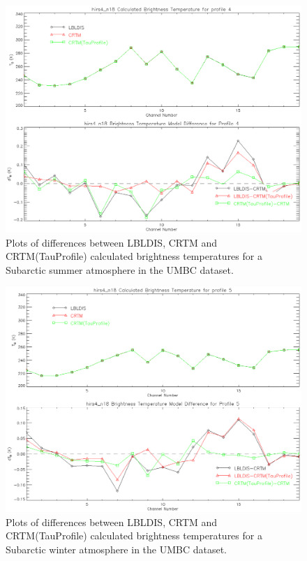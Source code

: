 \begin{figure}[htp]
  \centering{}
  \includegraphics[scale=0.8]{./graphics/SubArc_Summer_04.eps}
  \caption{Plots of differences between LBLDIS, CRTM and CRTM(TauProfile) calculated brightness temperatures for
   a Subarctic summer atmosphere in the UMBC dataset.}
  \label{fig:Subarctic_Summer_Dep}
\end{figure}

\begin{figure}[htp]
  \centering{}
  \includegraphics[scale=0.8]{./graphics/SubArc_Winter_05.eps}
  \caption{Plots of differences between LBLDIS, CRTM and CRTM(TauProfile) calculated brightness temperatures for
   a Subarctic winter atmosphere in the UMBC dataset.}
  \label{fig:Subarctic_Winter_Dep}
\end{figure}







\begin{appendix}
\end{appendix}




